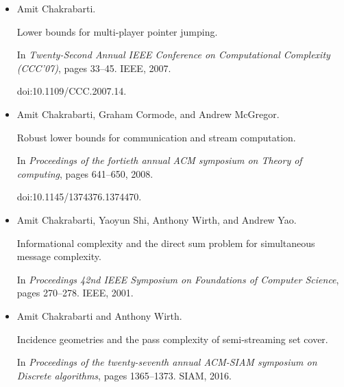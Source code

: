 \begin{itemize}
Beyond set disjointness: The communication complexity of finding the
intersection.


In \emph{Proceedings of the 2014 ACM Symposium on Principles of
Distributed Computing}, PODC ’14, pages 106–113, New York, NY, USA, 2014.
Association for Computing Machinery.


doi:10.1145/2611462.2611501.





\item[] 
[15]

Amit Chakrabarti.


Lower bounds for multi-player pointer jumping.


In \emph{Twenty-Second Annual IEEE Conference on Computational
Complexity (CCC’07)}, pages 33–45. IEEE, 2007.


doi:10.1109/CCC.2007.14.





\item[] 
[16]

Amit Chakrabarti, Graham Cormode, and Andrew McGregor.


Robust lower bounds for communication and stream computation.


In \emph{Proceedings of the fortieth annual ACM symposium on Theory of
computing}, pages 641–650, 2008.


doi:10.1145/1374376.1374470.





\item[] 
[17]

Amit Chakrabarti, Yaoyun Shi, Anthony Wirth, and Andrew Yao.


Informational complexity and the direct sum problem for simultaneous
message complexity.


In \emph{Proceedings 42nd IEEE Symposium on Foundations of Computer
Science}, pages 270–278. IEEE, 2001.





\item[] 
[18]

Amit Chakrabarti and Anthony Wirth.


Incidence geometries and the pass complexity of semi-streaming set
cover.


In \emph{Proceedings of the twenty-seventh annual ACM-SIAM symposium
on Discrete algorithms}, pages 1365–1373. SIAM, 2016.



\end{itemize}
